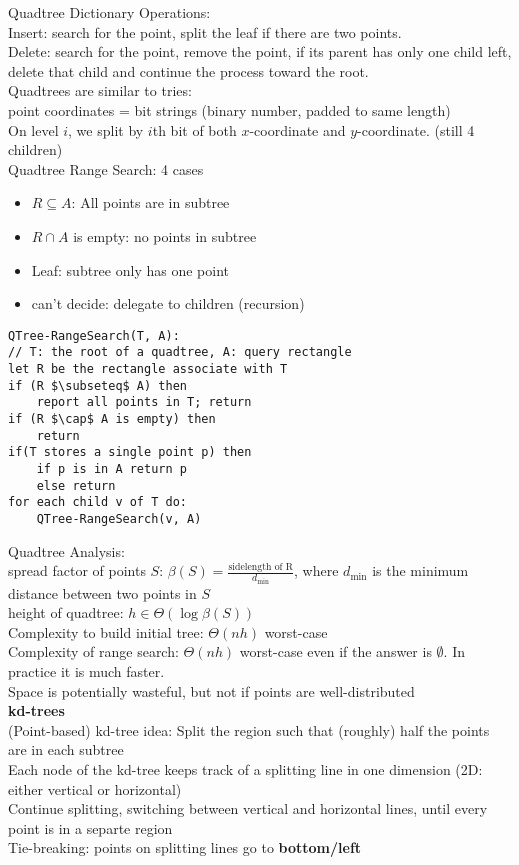 \documentclass[12pt]{article}
\begin{document}
{Quadtree Dictionary Operations:\\
Insert: search for the point, split the leaf if there are two points.\\
Delete: search for the point, remove the point, if its parent has only one child left, delete that child and continue the process toward the root.\\

Quadtrees are similar to tries:\\
point coordinates = bit strings (binary number, padded to same length)\\
On level $i$, we split by $i$th bit of both $x$-coordinate and $y$-coordinate. (still 4 children)\\

Quadtree Range Search: 4 cases
\begin{itemize}
	\renewcommand\labelitemi{--}
	\item $R \subseteq A$: All points are in subtree
	\item $R \cap A$ is empty: no points in subtree
	\item Leaf: subtree only has one point
    \item can't decide: delegate to children (recursion)
\end{itemize}
\begin{lstlisting}[mathescape=true]
QTree-RangeSearch(T, A):
// T: the root of a quadtree, A: query rectangle 
let R be the rectangle associate with T
if (R $\subseteq$ A) then 
	report all points in T; return
if (R $\cap$ A is empty) then
	return
if(T stores a single point p) then
	if p is in A return p
	else return
for each child v of T do:
	QTree-RangeSearch(v, A)
\end{lstlisting}

Quadtree Analysis:\\
spread factor of points $S$: $\beta(S) = \frac{\text{sidelength of R}}{d_{\min}}$, where $d_{\min}$ is the minimum distance between two points in $S$\\
height of quadtree: $h \in \Theta(\log \beta(S))$\\
Complexity to build initial tree: $\Theta(nh)$ worst-case\\
Complexity of range search: $\Theta(nh)$ worst-case even if the answer is $\emptyset$. In practice it is much faster.\\
Space is potentially wasteful, but not if points are well-distributed\\

\textbf{kd-trees}\\
(Point-based) kd-tree idea: Split the region such that (roughly) half the points are in each subtree \\
Each node of the kd-tree keeps track of a splitting line in one dimension (2D: either vertical or horizontal)\\
Continue splitting, switching between vertical and horizontal lines, until every point is in a separte region\\
Tie-breaking: points on splitting lines go to \textbf{bottom/left}\\

}
\end{document}
